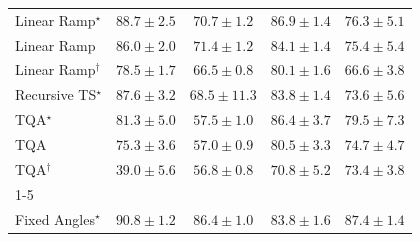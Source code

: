 \begin{tabular}{l|cccc|}
Linear Ramp$^\star$ & {\cellcolor[HTML]{7C2C05}} \color[HTML]{F1F1F1} $88.7\pm 2.5$ & {\cellcolor[HTML]{EF7718}} \color[HTML]{F1F1F1} $70.7\pm 1.2$ & {\cellcolor[HTML]{892F05}} \color[HTML]{F1F1F1} $86.9\pm 1.4$ & {\cellcolor[HTML]{D65808}} \color[HTML]{F1F1F1} $76.3\pm 5.1$ \\
Linear Ramp & {\cellcolor[HTML]{913204}} \color[HTML]{F1F1F1} $86.0\pm 2.0$ & {\cellcolor[HTML]{ED7316}} \color[HTML]{F1F1F1} $71.4\pm 1.2$ & {\cellcolor[HTML]{A03704}} \color[HTML]{F1F1F1} $84.1\pm 1.4$ & {\cellcolor[HTML]{DA5C0A}} \color[HTML]{F1F1F1} $75.4\pm 5.4$ \\
Linear Ramp$^\dagger$ & {\cellcolor[HTML]{CB4B02}} \color[HTML]{F1F1F1} $78.5\pm 1.7$ & {\cellcolor[HTML]{FB9225}} \color[HTML]{000000} $66.5\pm 0.8$ & {\cellcolor[HTML]{BE4503}} \color[HTML]{F1F1F1} $80.1\pm 1.6$ & {\cellcolor[HTML]{FA9125}} \color[HTML]{F1F1F1} $66.6\pm 3.8$ \\
Recursive TS$^\star$ & {\cellcolor[HTML]{842E05}} \color[HTML]{F1F1F1} $87.6\pm 3.2$ & {\cellcolor[HTML]{F5851F}} \color[HTML]{F1F1F1} $68.5\pm 11.3$ & {\cellcolor[HTML]{A13804}} \color[HTML]{F1F1F1} $83.8\pm 1.4$ & {\cellcolor[HTML]{E3660F}} \color[HTML]{F1F1F1} $73.6\pm 5.6$ \\
TQA$^\star$ & {\cellcolor[HTML]{B64203}} \color[HTML]{F1F1F1} $81.3\pm 5.0$ & {\cellcolor[HTML]{FEC95B}} \color[HTML]{000000} $57.5\pm 1.0$ & {\cellcolor[HTML]{8E3104}} \color[HTML]{F1F1F1} $86.4\pm 3.7$ & {\cellcolor[HTML]{C34802}} \color[HTML]{F1F1F1} $79.5\pm 7.3$ \\
TQA & {\cellcolor[HTML]{DB5D0B}} \color[HTML]{F1F1F1} $75.3\pm 3.6$ & {\cellcolor[HTML]{FECC61}} \color[HTML]{000000} $57.0\pm 0.9$ & {\cellcolor[HTML]{BC4503}} \color[HTML]{F1F1F1} $80.5\pm 3.3$ & {\cellcolor[HTML]{DE610C}} \color[HTML]{F1F1F1} $74.7\pm 4.7$ \\
TQA$^\dagger$ & {\cellcolor[HTML]{FFFFE5}} \color[HTML]{000000} $39.0\pm 5.6$ & {\cellcolor[HTML]{FECD63}} \color[HTML]{000000} $56.8\pm 0.8$ & {\cellcolor[HTML]{EF7718}} \color[HTML]{F1F1F1} $70.8\pm 5.2$ & {\cellcolor[HTML]{E46710}} \color[HTML]{F1F1F1} $73.4\pm 3.8$ \\
\cline{1-5}
\multicolumn{5}{c}{\rule{0pt}{8pt}PP} \\
\midrule
Fixed Angles$^\star$ & {\cellcolor[HTML]{00482A}} \color[HTML]{F1F1F1} $90.8\pm 1.2$ & {\cellcolor[HTML]{006034}} \color[HTML]{F1F1F1} $86.4\pm 1.0$ & {\cellcolor[HTML]{066D39}} \color[HTML]{F1F1F1} $83.8\pm 1.6$ & {\cellcolor[HTML]{005B32}} \color[HTML]{F1F1F1} $87.4\pm 1.4$ \\

\end{tabular}
